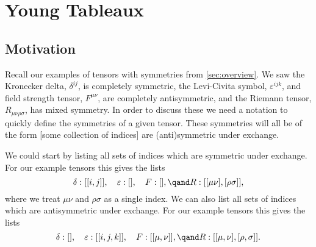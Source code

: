 \documentclass[fleqn]{NotesClass}
\begin{document}
    \chapter{Young Tableaux}
    \section{Motivation}
    Recall our examples of tensors with symmetries from \cref{sec:overview}.
    We saw the Kronecker delta, \(\delta^{ij}\), is completely symmetric, the Levi-Civita symbol, \(\varepsilon^{ijk}\), and field strength tensor, \(F^{\mu\nu}\), are completely antisymmetric, and the Riemann tensor, \(R_{\mu\nu\rho\sigma}\), has mixed symmetry.
    In order to discuss these we need a notation to quickly define the symmetries of a given tensor.
    These symmetries will all be of the form [some collection of indices] are (anti)symmetric under exchange.
    
    We could start by listing all sets of indices which are symmetric under exchange.
    For our example tensors this gives the lists
    \begin{equation}
        \delta: [[i, j]], \quad \varepsilon: [], \quad F: [], \qand R: [[\mu\nu], [\rho\sigma]],
    \end{equation}
    where we treat \(\mu\nu\) and \(\rho\sigma\) as a single index.
    We can also list all sets of indices which are antisymmetric under exchange.
    For our example tensors this gives the lists
    \begin{equation}
        \delta: [], \quad \varepsilon: [[i, j, k]], \quad F: [[\mu, \nu]], \qand R: [[\mu, \nu], [\rho, \sigma]].
    \end{equation}
    
\end{document}
